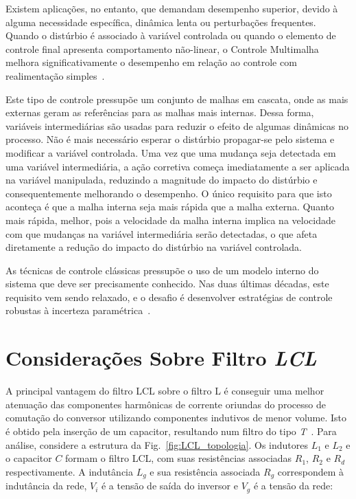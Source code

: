 	Existem aplicações, no entanto, que demandam desempenho superior, devido à alguma
	necessidade específica, dinâmica lenta ou perturbações frequentes. Quando o distúrbio
	é associado à variável controlada ou quando o elemento de controle final apresenta
	comportamento não-linear, o Controle Multimalha melhora significativamente o
	desempenho em relação ao controle com realimentação simples~\cite{ref:KRISHNA}.

	Este tipo de controle pressupõe um conjunto de malhas em cascata, onde as mais
	externas geram as referências para as malhas mais internas. Dessa forma, variáveis
	intermediárias são usadas para reduzir o efeito de algumas dinâmicas no processo.
	Não é mais necessário esperar o distúrbio propagar-se pelo sistema e modificar a
	variável controlada. Uma vez que uma mudança seja detectada em uma variável
	intermediária, a ação corretiva começa imediatamente a ser aplicada na variável
	manipulada, reduzindo a magnitude do impacto do distúrbio e consequentemente
	melhorando o desempenho. O único requisito para que isto aconteça é que a malha
	interna seja mais rápida que a malha externa. Quanto mais rápida, melhor, pois
	a velocidade da malha interna implica na velocidade com que mudanças na variável
	intermediária serão detectadas, o que afeta diretamente a redução do impacto
	do distúrbio na variável controlada.

	As técnicas de controle clássicas pressupõe o uso de um modelo interno do sistema
	que deve ser precisamente conhecido. Nas duas últimas décadas, este requisito
	vem sendo relaxado, e o desafio é desenvolver estratégias de controle robustas
	à incerteza paramétrica~\cite{ref:GEROMEL}.


\section{Considerações Sobre Filtro \emph{LCL}}

    A principal vantagem do filtro LCL sobre o filtro L é conseguir uma melhor
    atenuação das componentes harmônicas de corrente oriundas do processo de comutação do
    conversor utilizando componentes indutivos de menor volume. Isto é obtido pela
    inserção de um capacitor, resultando num filtro do tipo \emph{T}~\cite{ref:SHEN}.
    Para análise, considere a estrutura da Fig.~\ref{fig:LCL_topologia}. Os indutores
    $L_1$ e $L_2$ e o capacitor $C$ formam o filtro LCL, com suas resistências
    associadas $R_1$, $R_2$ e $R_d$ respectivamente. A indutância $L_g$ e sua
    resistência associada $R_g$ correspondem à indutância da rede, $V_i$
    é a tensão de saída do inversor e $V_g$ é a tensão da rede:

